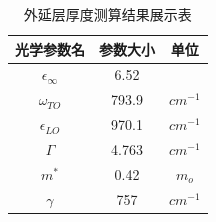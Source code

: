 \documentclass[UTF8]{ctexart}
\begin{document}
\begin{table}[H]
	\caption{外延层厚度测算结果展示表}
	\centering
	\renewcommand{\tabcolsep}{50pt}
	\begin{tabular}{ccc}
		\toprule[1.5pt]
		光学参数名&参数大小&单位 \\
		\midrule[1pt]
		$\epsilon_{\infty}$ & 6.52 &  \\
		$\omega_{TO}$ & 793.9 & $cm^{-1}$ \\
		$\epsilon_{LO}$ & 970.1 & $cm^{-1}$ \\
		$\Gamma$ & 4.763 & $cm^{-1}$ \\
		$m^{\ast}$ & 0.42 & $m_o$ \\
		$\gamma$ & 757 & $cm^{-1}$ \\
		\bottomrule[1pt]
	\end{tabular}
\end{table}\par
\end{document}
